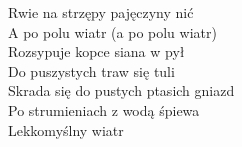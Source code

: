\begin{flushleft}
\hspace{0.9cm}Rwie na strzępy pajęczyny nić  \\
\hspace{0.9cm}A po polu wiatr (a po polu wiatr)  \\
\hspace{0.9cm}Rozsypuje kopce siana w pył  \\
\hspace{0.9cm}Do puszystych traw się tuli  \\
\hspace{0.9cm}Skrada się do pustych ptasich gniazd  \\
\hspace{0.9cm}Po strumieniach z wodą śpiewa  \\
\hspace{0.9cm}Lekkomyślny wiatr \\
\end{flushleft}
\clearpage
